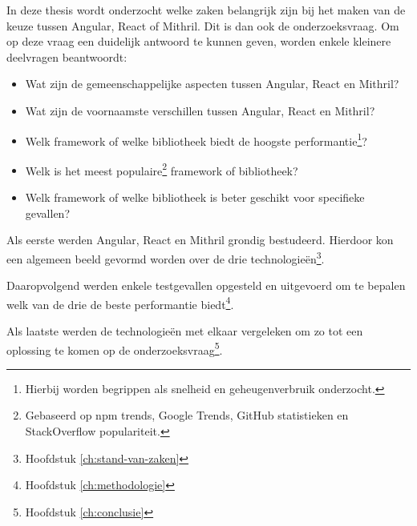 In deze thesis wordt onderzocht welke zaken belangrijk zijn bij het maken van de keuze tussen Angular, React of Mithril. Dit is dan ook de onderzoeksvraag. Om op deze vraag een duidelijk antwoord te kunnen geven, worden enkele kleinere deelvragen beantwoordt:
\begin{itemize}
    \item Wat zijn de gemeenschappelijke aspecten tussen Angular, React en Mithril?
    \item Wat zijn de voornaamste verschillen tussen Angular, React en Mithril?
    \item Welk framework of welke bibliotheek biedt de hoogste performantie\footnote{Hierbij worden begrippen als snelheid en geheugenverbruik onderzocht.}?
    \item Welk is het meest populaire\footnote{Gebaseerd op npm trends, Google Trends, GitHub statistieken en StackOverflow populariteit.} framework of bibliotheek?
    \item Welk framework of welke bibliotheek is beter geschikt voor specifieke gevallen?
\end{itemize}

Als eerste werden Angular, React en Mithril grondig bestudeerd. Hierdoor kon een algemeen beeld gevormd worden over de drie technologieën\footnote{Hoofdstuk \ref{ch:stand-van-zaken}}.

Daaropvolgend werden enkele testgevallen opgesteld en uitgevoerd om te bepalen welk van de drie de beste performantie biedt\footnote{Hoofdstuk \ref{ch:methodologie}}.

Als laatste werden de technologieën met elkaar vergeleken om zo tot een oplossing te komen op de onderzoeksvraag\footnote{Hoofdstuk \ref{ch:conclusie}}.
